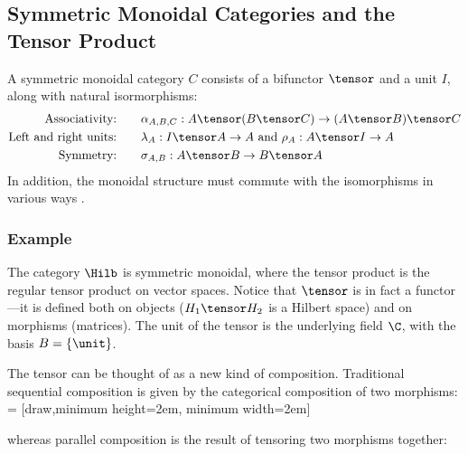 \subsection{Symmetric Monoidal Categories and the Tensor Product}

\begin{definition}
A symmetric monoidal category $C$ consists of a bifunctor $\tensor$
and a unit $I$, along with natural isormorphisms:
\begin{align*}
    \text{Associativity:}&\qquad 
    \alpha_{A,B,C} : A \tensor (B \tensor C) \rightarrow (A \tensor B) \tensor C \\
    \text{Left and right units:}&\qquad 
    \lambda_A : I \tensor A \rightarrow A \text{ and } \rho_A : A \tensor I \rightarrow A \\
    \text{Symmetry:}&\qquad 
    \sigma_{A,B} : A \tensor B \rightarrow B \tensor A \\
\end{align*}
In addition, the monoidal structure must commute with the isomorphisms in 
various ways .
\end{definition}

\subsubsection*{Example}
The category $\Hilb$ is symmetric monoidal, where the tensor product
is the regular tensor product on vector spaces. Notice that $\tensor$ is
in fact a functor---it is defined both on objects ($H_1 \tensor H_2$ is a Hilbert space)
and on morphisms (matrices).
The unit of the tensor is the underlying field $\C$, with the basis $B = \{ \unit \}$.

The tensor can be thought of as a new kind of composition. Traditional
sequential composition is given by the categorical composition of two morphisms:
 = [draw,minimum height=2em, minimum width=2em]
\begin{center}  \end{center}
whereas parallel composition is the result of tensoring two morphisms together:
\begin{center}  \end{center}


